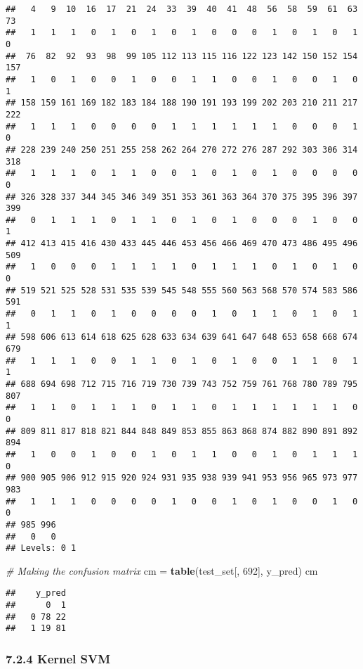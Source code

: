 \documentclass[]{article}
\newenvironment{Shaded}{\begin{snugshade}}{\end{snugshade}}
\newcommand{\CommentTok}[1]{\textcolor[rgb]{0.56,0.35,0.01}{\textit{#1}}}
\newcommand{\DecValTok}[1]{\textcolor[rgb]{0.00,0.00,0.81}{#1}}
\newcommand{\KeywordTok}[1]{\textcolor[rgb]{0.13,0.29,0.53}{\textbf{#1}}}
\newcommand{\NormalTok}[1]{#1}
\newcommand{\StringTok}[1]{\textcolor[rgb]{0.31,0.60,0.02}{#1}}
\begin{document}
\begin{verbatim}
##   4   9  10  16  17  21  24  33  39  40  41  48  56  58  59  61  63  73 
##   1   1   1   0   1   0   1   0   1   0   0   0   1   0   1   0   1   0 
##  76  82  92  93  98  99 105 112 113 115 116 122 123 142 150 152 154 157 
##   1   0   1   0   0   1   0   0   1   1   0   0   1   0   0   1   0   1 
## 158 159 161 169 182 183 184 188 190 191 193 199 202 203 210 211 217 222 
##   1   1   1   0   0   0   0   1   1   1   1   1   1   0   0   0   1   0 
## 228 239 240 250 251 255 258 262 264 270 272 276 287 292 303 306 314 318 
##   1   1   1   0   1   1   0   0   1   0   1   0   1   0   0   0   0   0 
## 326 328 337 344 345 346 349 351 353 361 363 364 370 375 395 396 397 399 
##   0   1   1   1   0   1   1   0   1   0   1   0   0   0   1   0   0   1 
## 412 413 415 416 430 433 445 446 453 456 466 469 470 473 486 495 496 509 
##   1   0   0   0   1   1   1   1   0   1   1   1   0   1   0   1   0   0 
## 519 521 525 528 531 535 539 545 548 555 560 563 568 570 574 583 586 591 
##   0   1   1   0   1   0   0   0   0   1   0   1   1   0   1   0   1   1 
## 598 606 613 614 618 625 628 633 634 639 641 647 648 653 658 668 674 679 
##   1   1   1   0   0   1   1   0   1   0   1   0   0   1   1   0   1   1 
## 688 694 698 712 715 716 719 730 739 743 752 759 761 768 780 789 795 807 
##   1   1   0   1   1   1   0   1   1   0   1   1   1   1   1   1   0   0 
## 809 811 817 818 821 844 848 849 853 855 863 868 874 882 890 891 892 894 
##   1   0   0   1   0   0   1   0   1   1   0   0   1   0   1   1   1   0 
## 900 905 906 912 915 920 924 931 935 938 939 941 953 956 965 973 977 983 
##   1   1   1   0   0   0   0   1   0   0   1   0   1   0   0   1   0   0 
## 985 996 
##   0   0 
## Levels: 0 1
\end{verbatim}

\begin{Shaded}
\begin{Highlighting}[]
\CommentTok{# Making the confusion matrix}
\NormalTok{cm =}\StringTok{ }\KeywordTok{table}\NormalTok{(test_set[, }\DecValTok{692}\NormalTok{], y_pred)}
\NormalTok{cm}
\end{Highlighting}
\end{Shaded}

\begin{verbatim}
##    y_pred
##      0  1
##   0 78 22
##   1 19 81
\end{verbatim}

\hypertarget{kernel-svm}{%
\subsubsection{7.2.4 Kernel SVM}\label{kernel-svm}}
\end{document}
